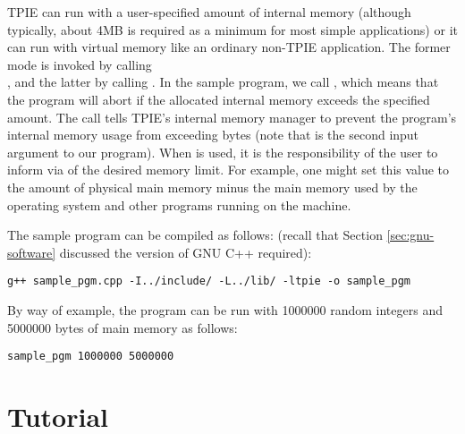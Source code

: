 TPIE can run with a user-specified amount of internal memory
(although typically, about 4MB is required as a minimum for
most simple applications) or it can run with virtual memory
like an ordinary non-TPIE application. The former mode is
invoked by calling \\%
, and the latter
by calling . In
the sample program, we call
, which means
that the program will abort if the allocated internal memory
exceeds the specified amount. The call
 tells
TPIE's internal memory manager  to
prevent the program's internal memory usage from exceeding
 bytes (note that
 is the second input argument to our
program). When 
is used, it is the responsibility of the user to inform
 via  of the
desired memory limit.  For example, one might set this value
to the amount of physical main memory minus the main memory
used by the operating system and other programs running on
the machine.


The sample program can be compiled as follows:
(recall that Section \ref{sec:gnu-software} discussed the version of GNU C++
required):

\begin{verbatim}
g++ sample_pgm.cpp -I../include/ -L../lib/ -ltpie -o sample_pgm
\end{verbatim}

By way of example, the program can be run with 1000000 random integers and 5000000 bytes of main
memory as follows:
\begin{verbatim}
sample_pgm 1000000 5000000
\end{verbatim}


\chapter{Tutorial}

